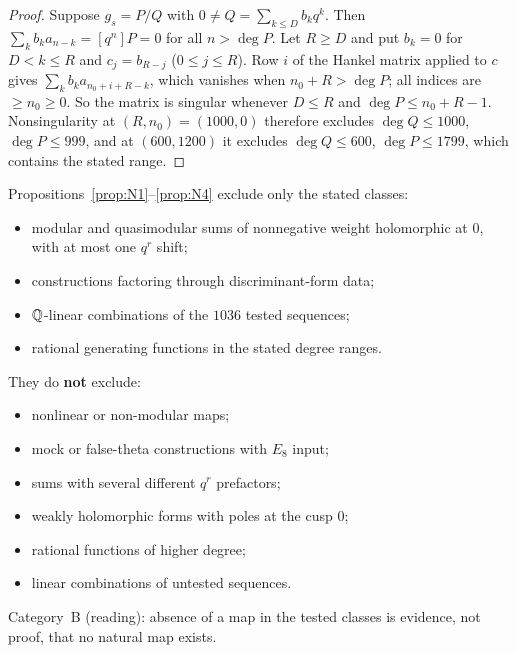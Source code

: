\begin{proof}
Suppose $g_s=P/Q$ with $0\neq Q=\sum_{k\le D}b_kq^k$. Then $\sum_kb_ka_{n-k}=[q^n]P=0$ for all $n>\deg P$. Let $R\ge D$ and put $b_k=0$ for $D<k\le R$ and $c_j=b_{R-j}$ ($0\le j\le R$). Row $i$ of the Hankel matrix applied to $c$ gives $\sum_kb_ka_{n_0+i+R-k}$, which vanishes when $n_0+R>\deg P$; all indices are $\ge n_0\ge0$. So the matrix is singular whenever $D\le R$ and $\deg P\le n_0+R-1$. Nonsingularity at $(R,n_0)=(1000,0)$ therefore excludes $\deg Q\le1000$, $\deg P\le999$, and at $(600,1200)$ it excludes $\deg Q\le600$, $\deg P\le1799$, which contains the stated range.
\end{proof}

\begin{remark}\label{rem:N1scope}
Propositions~\ref{prop:N1}--\ref{prop:N4} exclude only the stated classes:
\begin{itemize}
\item modular and quasimodular sums of nonnegative weight holomorphic at $0$, with at most one $q^r$ shift;
\item constructions factoring through discriminant-form data;
\item $\mathbb{Q}$-linear combinations of the $1036$ tested sequences;
\item rational generating functions in the stated degree ranges.
\end{itemize}
They do \textbf{not} exclude:
\begin{itemize}
\item nonlinear or non-modular maps;
\item mock or false-theta constructions with $E_8$ input;
\item sums with several different $q^r$ prefactors;
\item weakly holomorphic forms with poles at the cusp $0$;
\item rational functions of higher degree;
\item linear combinations of untested sequences.
\end{itemize}
Category~B (reading): absence of a map in the tested classes is evidence, not proof, that no natural map exists.
\end{remark}
